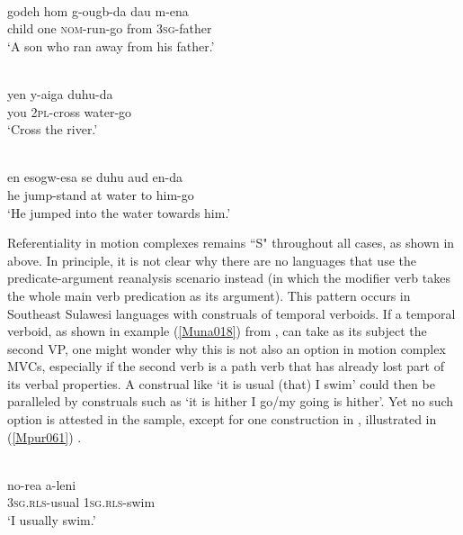 \ea \label{Sougb002a}
\\
\gll godeh hom g-ougb-da dau m-ena \\
child one \textsc{nom}-run-go from \textsc{3}\textsc{sg}-father \\
\glft `A son who ran away from his father.' \\ 
\z

\ea
{}\\
\gll yen y-aiga duhu-da \\ 
you \textsc{2}\textsc{pl}-cross water-go \\
\glft `Cross the river.'\\ 
\z

\ea
{}\\
\gll en esogw-esa se duhu aud en-da \\ 
he jump-stand at water to him-go \\
\glft `He jumped into the water towards him.'\\ 
\z
\xe

Referentiality in motion complexes remains ``S" throughout all cases, as shown in  above. In principle, it is not clear why there are no languages that use the predicate-argument reanalysis scenario instead (in which the modifier verb takes the whole main verb predication as its argument). This pattern occurs in Southeast Sulawesi languages with construals of temporal verboids. If a temporal verboid, as shown in example (\ref{Muna018}) from , can take as its subject the second VP, one might wonder why this is not also an option in motion complex MVCs, especially if the second verb is a path verb that has already lost part of its verbal properties. A construal like `it is usual (that) I swim' could then be paralleled by construals such as `it is hither I go/my going is hither'. Yet no such option is attested in the sample, except for one construction in , illustrated in (\ref{Mpur061}) .

\ea \label{Muna018}
\\
\gll no-rea a-leni \\
\textsc{3}\textsc{sg}.\textsc{rls}-usual \textsc{1}\textsc{sg}.\textsc{rls}-swim \\
\glft `I usually swim.'\\ 
\z

